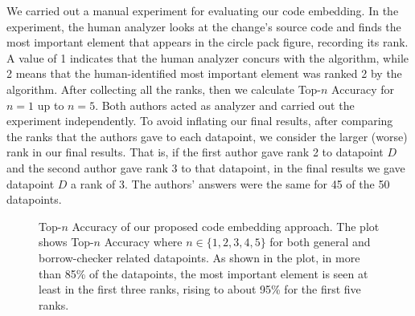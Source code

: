 We carried out a manual experiment for evaluating our code embedding. In the experiment, the human analyzer looks at the change's source code and finds the most important element that appears in the circle pack figure, recording its rank. A value of 1 indicates that the human analyzer concurs with the algorithm, while 2 means that the human-identified most important element was ranked 2 by the algorithm. After collecting all the ranks, then we calculate Top-$n$ Accuracy for $n=1$ up to $n=5$. Both authors acted as analyzer and carried out the experiment independently. To avoid inflating our final results, after comparing the ranks that the authors gave to each datapoint, we consider the larger (worse) rank in our final results. That is, if the first author gave rank 2 to datapoint $D$ and the second author gave rank 3 to that datapoint, in the final results we gave datapoint $D$ a rank of 3. The authors' answers were the same for 45 of the 50 datapoints. 

\begin{figure}[h]
\centering

\caption{\label{fig:rq1} Top-$n$ Accuracy of our proposed code embedding approach. The plot shows Top-$n$ Accuracy where $n\in\{1,2,3,4,5\}$ for both general and borrow-checker related datapoints. As shown in the plot, in more than 85\% of the datapoints, the most important element is seen at least in the first three ranks, rising to about 95\% for the first five ranks.}

\end{figure}

